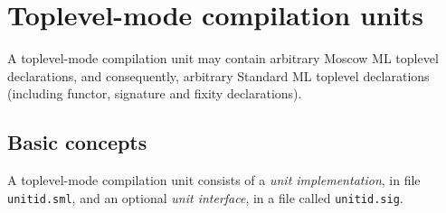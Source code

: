 \documentclass[fleqn,a4paper]{article}
\begin{document}

        






\newpage

\section{Toplevel-mode compilation units}
\label{sec-toplevel-mode}

A toplevel-mode compilation unit may contain arbitrary Moscow ML
toplevel declarations, and consequently, arbitrary Standard ML
toplevel declarations (including functor, signature and fixity
declarations).


\subsection{Basic concepts}

A toplevel-mode compilation unit consists of a {\em unit
  implementation}, in file \texttt{unitid.sml}, and an optional {\em
  unit interface}, in a file called \texttt{unitid.sig}\@.  
\end{document}
